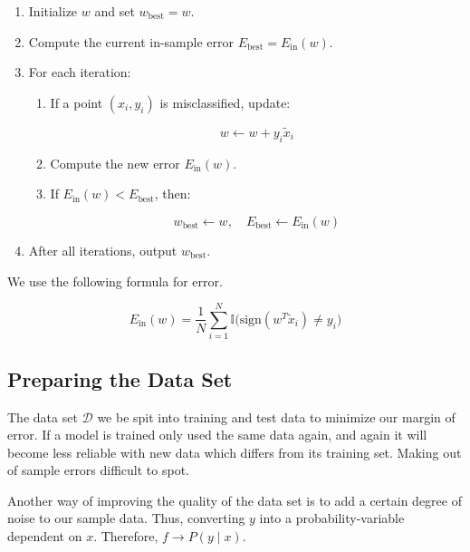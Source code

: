 \begin{enumerate}

    \item Initialize \( w \) and set \( w_{\text{best}} = w \).
    
    \item Compute the current in-sample error \( E_{\text{best}} = E_{\text{in}}(w) \).
    
    \item For each iteration:
    
        \begin{enumerate}
        
            \item If a point \( (x_i, y_i) \) is misclassified, update:
        
                \[
                    w \leftarrow w + y_i \tilde{x}_i
                \]
 
            \item Compute the new error \( E_{\text{in}}(w) \).
        
        \item If \( E_{\text{in}}(w) < E_{\text{best}} \), then:
        
            \[
                w_{\text{best}} \leftarrow w, \quad E_{\text{best}} \leftarrow E_{\text{in}}(w)
            \]

    \end{enumerate}

    \item After all iterations, output \( w_{\text{best}} \).

\end{enumerate}

We use the following formula for error.

\[
    E_{\text{in}}(w) = \frac{1}{N} \sum_{i=1}^{N} \mathbb{I}\big( \text{sign}(w^T \tilde{x}_i) \neq y_i \big)
\]

\subsection{Preparing the Data Set}

The data set \(\mathcal{D}\) we be spit into training and test data to minimize our 
margin of error. If a model is trained only used the same data again, and again it will become 
less reliable with new data which differs from its training set. Making out of sample errors 
difficult to spot.

Another way of improving the quality of the data set is to add a certain degree of noise to our sample data. Thus, 
converting \(y\) into a probability-variable dependent on \(x\). Therefore, \(f \to P(y \mid x)\).

